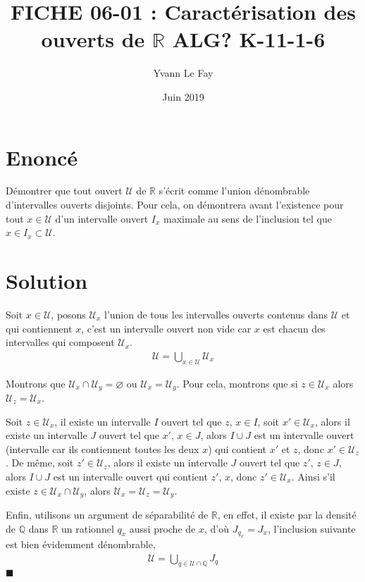 \documentclass{article}
\newcommand*{\QED}{\hfill\ensuremath{\blacksquare}}%
\begin{document}
\title{FICHE 06-01 : Caractérisation des ouverts de $\mathbb{R}$ ALG? K-11-1-6}
\author{Yvann Le Fay}
\date{Juin 2019}
\maketitle

\section*{Enoncé}
Démontrer que tout ouvert $\mathcal{U}$ de $\mathbb{R}$ s'écrit comme l'union dénombrable d'intervalles ouverts disjoints. Pour cela, on démontrera avant l'existence pour tout $x\in \mathcal{U}$ d'un intervalle ouvert $I_x$ maximale au sens de l'inclusion tel que $x\in I_x\subset \mathcal{U}$.
\section*{Solution}
Soit $x\in \mathcal{U}$, posons $\mathcal{U}_x$ l'union de tous les intervalles ouverts contenus dans $\mathcal{U}$ et qui contiennent $x$, c'est un intervalle ouvert non vide car $x$ est chacun des intervalles qui composent $\mathcal{U}_x$.
\begin{align*}
\mathcal{U} = \bigcup_{x\in \mathcal{U}}\mathcal{U}_x
\end{align*}

Montrons que $\mathcal{U}_x\cap \mathcal{U}_y = \varnothing$ ou $\mathcal{U}_x = \mathcal{U}_y$. Pour cela, montrons que si $z\in\mathcal{U}_x$ alors $\mathcal{U}_z = \mathcal{U}_x$.

Soit $z\in\mathcal{U}_x$, il existe un intervalle $I$ ouvert tel que $z,\, x\in I$, soit $x'\in \mathcal{U}_x$, alors il existe un intervalle $J$ ouvert tel que $x',\, x\in J$, alors $I\cup J$ est un intervalle ouvert (intervalle car ils contiennent toutes les deux $x$) qui contient $x'$ et $z$, donc $x'\in \mathcal{U}_z$. De même, soit $z'\in \mathcal{U}_z$, alors il existe un intervalle $J$ ouvert tel que $z',\,z\in J$, alors $I\cup J$ est un intervalle ouvert qui contient $z',\, x$, donc $z'\in\mathcal{U}_x$. Ainsi s'il existe $z\in\mathcal{U}_x\cap \mathcal{U}_y$, alors $\mathcal{U}_x=\mathcal{U}_z=\mathcal{U}_y$. 

Enfin, utilisons un argument de séparabilité de $\mathbb{R}$, en effet, il existe par la densité de $\mathbb{Q}$ dans $\mathbb{R}$ un rationnel $q_x$ aussi proche de $x$, d'où $J_{q_x}=J_x$, l'inclusion suivante est bien évidemment dénombrable, 
\begin{align*}
\mathcal{U} = \bigcup_{q\in\mathcal{U}\cap \mathbb{Q}}J_q
\end{align*}
\QED
\end{document}
